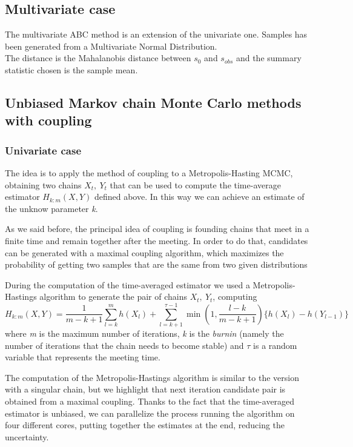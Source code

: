 \documentclass {article}
\begin{document}
\subsection{Multivariate case}
The multivariate ABC method is an extension of the univariate one. Samples has been generated from a Multivariate Normal Distribution.\\
The distance is the Mahalanobis distance between  $s_{0}$ and $s_{obs}$ and the summary statistic chosen is the sample mean.



\subsection{Unbiased Markov chain Monte Carlo methods with coupling}

\subsubsection{Univariate case}

The idea is to apply the method of coupling to a Metropolis-Hasting MCMC, obtaining two chains ${X_t}, \: {Y_t}$ that can be used to compute the time-average estimator $H_{k:m}(X,Y)$ defined above. In this way we can achieve an estimate of the unknow parameter \emph{k}.

As we said before, the principal idea of coupling is founding chains that meet in a finite time and remain together after the meeting. In order to do that, candidates can be generated with a maximal coupling algorithm, which maximizes the probability of getting two samples that are the same from two given distributions

During the computation of the time-averaged estimator we used  a Metropolis-Hastings algorithm to generate the pair of chains ${X_t}, \: {Y_t}$, computing 
$$ H_{k:m}(X,Y)
= \frac{1}{m-k+1}\sum_{l=k}^{m}h(X_l) 
+ \sum_{l=k+1}^{\tau -1}\min(1, \frac{l-k}{m-k+1})\{h(X_l)-h(Y_{l-1})\} 
$$
where \emph{m} is the maximum number of iterations, \emph{k} is the \emph{burnin} (namely the number of iterations that the chain needs to become stable) and $\tau$ is a random variable that represents the meeting time.

The computation of the Metropolis-Hastings algorithm is similar to the version with a singular chain, but we highlight that next iteration candidate pair is obtained from a maximal coupling.
Thanks to the fact that the time-averaged estimator is unbiased, we can parallelize the process running the algorithm on four different cores, putting together the estimates at the end, reducing the uncertainty. 
\end{document}
